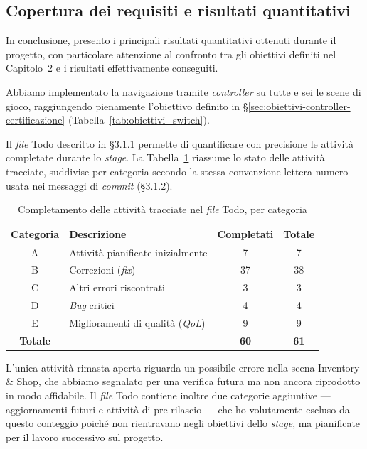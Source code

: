 \subsection{Copertura dei requisiti e risultati quantitativi}
\label{sec:copertura_requisiti}

In conclusione, presento i principali risultati quantitativi ottenuti durante il progetto, con particolare attenzione al confronto tra gli obiettivi definiti nel Capitolo~2 e i risultati effettivamente conseguiti.
 
Abbiamo implementato la navigazione tramite \textit{controller} su tutte e sei le scene di gioco, raggiungendo pienamente l'obiettivo definito in \S\ref{sec:obiettivi-controller-certificazione} (Tabella~\ref{tab:obiettivi_switch}).
 
Il \textit{file} Todo descritto in \S3.1.1 permette di quantificare con precisione le attività completate durante lo \textit{stage}. La Tabella~\ref{tab:todo-completamento} riassume lo stato delle attività tracciate, suddivise per categoria secondo la stessa convenzione lettera-numero usata nei messaggi di \textit{commit} (\S3.1.2).
 
\begin{table}[h]
\centering
\begin{tabular}{|c|p{6cm}|c|c|}
\hline
\textbf{Categoria} & \textbf{Descrizione} & \textbf{Completati} & \textbf{Totale} \\
\hline
A & Attività pianificate inizialmente & 7 & 7 \\
\hline
B & Correzioni (\textit{fix}) & 37 & 38 \\
\hline
C & Altri errori riscontrati & 3 & 3 \\
\hline
D & \textit{Bug} critici & 4 & 4 \\
\hline
E & Miglioramenti di qualità (\textit{QoL}) & 9 & 9 \\
\hline
\textbf{Totale} & & \textbf{60} & \textbf{61} \\
\hline
\end{tabular}
\caption{Completamento delle attività tracciate nel \textit{file} Todo, per categoria}
\label{tab:todo-completamento}
\end{table}
 
L'unica attività rimasta aperta riguarda un possibile errore nella scena Inventory \& Shop, che abbiamo segnalato per una verifica futura ma non ancora riprodotto in modo affidabile. Il \textit{file} Todo contiene inoltre due categorie aggiuntive — aggiornamenti futuri e attività di pre-rilascio — che ho volutamente escluso da questo conteggio poiché non rientravano negli obiettivi dello \textit{stage}, ma pianificate per il lavoro successivo sul progetto.
 
